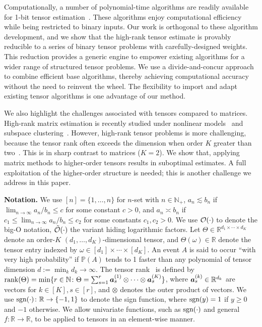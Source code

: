 \documentclass{article}
\theoremstyle{plain}
\theoremstyle{definition}
\def\sign{\textup{sgn}}
\begin{document}
Computationally, a number of polynomial-time algorithms are readily available for 1-bit tensor estimation~\cite{wang2018learning, han2020optimal, ghadermarzy2018learning}. These algorithms enjoy computational efficiency while being restricted to binary inputs. Our work is orthogonal to these algorithm development, and we show that the high-rank tensor estimate is provably reducible to a series of binary tensor problems with carefully-designed weights. This reduction provides a generic engine to empower existing algorithms for a wider range of structured tensor problems. We use a divide-and-concur approach to combine efficient base algorithms, thereby achieving computational accuracy without the need to reinvent the wheel. The flexibility to import and adapt existing tensor algorithms is one advantage of our method. 

We also highlight the challenges associated with tensors compared to matrices. High-rank matrix estimation is recently studied under nonlinear models~\citep{ganti2015matrix} and subspace clustering~\citep{pmlr-v70-ongie17a,fan2019online}. However, high-rank tensor problems is more challenging, because the tensor rank often exceeds the dimension when order $K$ greater than two~\citep{anandkumar2017analyzing}. This is in sharp contrast to matrices ($K=2$). We show that, applying matrix methods to higher-order tensors results in suboptimal estimates. A full exploitation of the higher-order structure is needed; this is another challenge we address in this paper.

{\bf Notation.} We use $[n]=\{1,\ldots,n\}$ for $n$-set with $n\in\mathbb{N}_{+}$, $a_n\lesssim b_n$ if $\lim_{n\to\infty} a_n/b_n\leq c$ for some constant $c>0$, and $a_n\asymp b_n$ if $c_1\leq \lim_{n\to \infty} a_n/b_n\leq c_2$ for some constants $c_1,c_2>0$. We use $\mathcal{O}(\cdot)$ to denote the big-O notation, $\tilde {\mathcal{O}}(\cdot)$ the variant hiding logarithmic factors. Let $\Theta\in\mathbb{R}^{d_1\times \cdots \times d_K}$ denote an order-$K$ $(d_1,\ldots,d_K)$-dimensional tensor, and $\Theta(\omega)\in\mathbb{R}$ denote the tensor entry indexed by $\omega \in[d_1]\times \cdots \times [d_K]$. An event $A$ is said to occur ``with very high probability'' if $\mathbb{P}(A)$ tends to 1 faster than any polynomial of tensor dimension $d:=\min_k d_k \to\infty$. The tensor rank~\citep{hitchcock1927expression} is defined by $\text{rank}(\Theta)=\min\{r\in\mathbb{N}\colon \Theta=\sum_{s=1}^r\bm{a}^{(1)}_s\otimes\cdots\otimes \bm{a}^{(K)}_s\}$, where $\bm{a}^{(k)}_s\in\mathbb{R}^{d_k}$ are vectors for $k\in[K], s\in[r]$, and $\otimes$ denotes the outer product of vectors. We use $\sign(\cdot)\colon \mathbb{R}\to\{-1,1\}$ to denote the sign function, where $\sign(y)=1$ if $y\geq 0$ and $-1$ otherwise. We allow univariate functions, such as $\sign(\cdot)$ and general $f\colon \mathbb{R}\to\mathbb{R}$, to be applied to tensors in an element-wise manner. 
\end{document}
